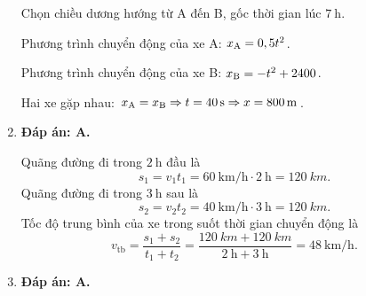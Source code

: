 \begin{enumerate}[label=\bfseries Câu \arabic*:]
{		Chọn chiều dương hướng từ A đến B, gốc thời gian lúc $\SI{7}{\hour}$.
		
		Phương trình chuyển động của xe A: $x_\text A = 0,5t^2$.
		
		Phương trình chuyển động của xe B: $x_\text B=-t^2 + 2400$.
		
		Hai xe gặp nhau: $x_\text A = x_\text B \Rightarrow t = \SI{40}{\second} \Rightarrow x=\SI{800}{\meter}$.
		
		
	}
	\item {}
	
	\loigiai
	{\textbf{Đáp án: A.}
		
		Quãng đường đi trong $\SI{2}{\hour}$ đầu là
		$$s_1 = v_1t_1 = \SI{60}{\km/\hour}\cdot\SI{2}{\hour} = \SI{120}{km}.$$
		Quãng đường đi trong $\SI{3}{\hour}$ sau là
		$$s_2 = v_2t_2 = \SI{40}{\km/\hour}\cdot\SI{3}{\hour} = \SI{120}{km}.$$
		Tốc độ trung bình của xe trong suốt thời gian chuyển động là
		$$v_{\text{tb}}=\dfrac{s_1+s_2}{t_1+t_2}=\dfrac{\SI{120}{km}+\SI{120}{km}}{\SI{2}{\hour}+\SI{3}{\hour}}=\SI{48}{\km/\hour}.$$
		
		
	}
	\item {}
	
	\loigiai
	{\textbf{Đáp án: A.}
		
}
\end{enumerate}
